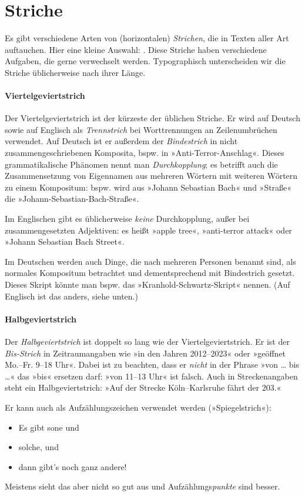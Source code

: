 \section{Striche}

Es gibt verschiedene Arten von (horizontalen) \emph{Strichen}, die in
Texten aller Art auftauchen.  Hier eine kleine Auswahl:
\Char{-\,--\,---\,$-$\,$=$}.  Diese Striche haben verschiedene
Aufgaben, die gerne verwechselt werden.  Typographisch unterscheiden
wir die Striche üblicherweise nach ihrer Länge.

\paragraph{Viertelgeviertstrich}
Der Viertelgeviertstrich \Char{-} ist der kürzeste der üblichen
Striche.  Er wird auf Deutsch sowie auf Englisch als
\emph{Trennstrich} bei Worttrennungen an Zeilenumbrüchen verwendet.
Auf Deutsch ist er außerdem der \emph{Bindestrich} in nicht
zusammenge\-schriebenen Komposita, bspw. in »Anti-Terror-Anschlag«.
Dieses grammatikalische Phänomen nennt man \emph{Durchkopplung}; es
betrifft auch die Zusammensetzung von Eigennamen aus mehreren Wörtern
mit weiteren Wörtern zu einem Kompositum: bspw. wird aus »Johann
Sebastian Bach« und »Straße« die »Johann-Sebastian-Bach-Straße«.

Im Englischen gibt es üblicherweise \emph{keine} Durchkopplung, außer
bei zusammengesetzten Adjektiven: es heißt »apple tree«, »anti-terror
attack« oder »Johann Sebastian Bach Street«.

Im Deutschen werden auch Dinge, die nach mehreren Personen benannt
sind, als normales Kompositum betrachtet und dementsprechend mit
Bindestrich gesetzt.  Dieses Skript könnte man bspw. das
»Kranhold-Schwartz-Skript« nennen.  (Auf Englisch ist das anders,
siehe unten.)

\paragraph{Halbgeviertstrich}
Der \emph{Halbgeviertstrich} \Char{--} ist doppelt so lang wie der
Viertelgeviertstrich.  Er ist der \emph{Bis-Strich} in Zeitraumangaben
wie »in den Jahren 2012--2023« oder »geöffnet Mo.--Fr. 9--18 Uhr«.
Dabei ist zu beachten, dass er \emph{nicht} in der Phrase »von … bis
…« das »bis« ersetzen darf: »von 11--13 Uhr« ist falsch.  Auch in
Streckenangaben steht ein Halbgeviertstrich: »Auf der Strecke
Köln--Karlsruhe fährt der  203.«

Er kann auch als Aufzählungszeichen verwendet werden
(»Spiegelstrich«):
\begin{itemize}[label=--,nosep]
\item Es gibt sone und
\item solche, und
\item dann gibt's noch ganz andere!
\end{itemize}
Meistens sieht das aber nicht so gut aus und Aufzählungs\emph{punkte}
sind besser.

